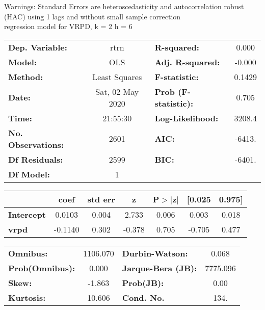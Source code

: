 Warnings: \newline
 [1] Standard Errors are heteroscedasticity and autocorrelation robust (HAC) using 1 lags and without small sample correction\\ 

regression model for VRPD, k = 2 h = 6\begin{center}
\begin{tabular}{lclc}
\toprule
\textbf{Dep. Variable:}    &       rtrn       & \textbf{  R-squared:         } &     0.000   \\
\textbf{Model:}            &       OLS        & \textbf{  Adj. R-squared:    } &    -0.000   \\
\textbf{Method:}           &  Least Squares   & \textbf{  F-statistic:       } &    0.1429   \\
\textbf{Date:}             & Sat, 02 May 2020 & \textbf{  Prob (F-statistic):} &    0.705    \\
\textbf{Time:}             &     21:55:30     & \textbf{  Log-Likelihood:    } &    3208.4   \\
\textbf{No. Observations:} &        2601      & \textbf{  AIC:               } &    -6413.   \\
\textbf{Df Residuals:}     &        2599      & \textbf{  BIC:               } &    -6401.   \\
\textbf{Df Model:}         &           1      & \textbf{                     } &             \\
\bottomrule
\end{tabular}
\begin{tabular}{lcccccc}
                   & \textbf{coef} & \textbf{std err} & \textbf{z} & \textbf{P$> |$z$|$} & \textbf{[0.025} & \textbf{0.975]}  \\
\midrule
\textbf{Intercept} &       0.0103  &        0.004     &     2.733  &         0.006        &        0.003    &        0.018     \\
\textbf{vrpd}      &      -0.1140  &        0.302     &    -0.378  &         0.705        &       -0.705    &        0.477     \\
\bottomrule
\end{tabular}
\begin{tabular}{lclc}
\textbf{Omnibus:}       & 1106.070 & \textbf{  Durbin-Watson:     } &    0.068  \\
\textbf{Prob(Omnibus):} &   0.000  & \textbf{  Jarque-Bera (JB):  } & 7775.096  \\
\textbf{Skew:}          &  -1.863  & \textbf{  Prob(JB):          } &     0.00  \\
\textbf{Kurtosis:}      &  10.606  & \textbf{  Cond. No.          } &     134.  \\
\bottomrule
\end{tabular}
\end{center}

